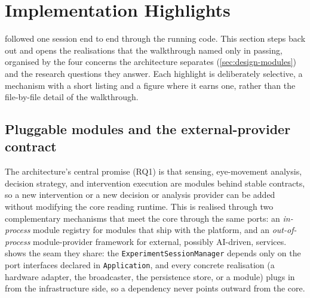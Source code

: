 \section{Implementation Highlights}
\label{sec:impl-highlights}
\usetikzlibrary{shapes.multipart, arrows.meta}

 followed one session end to end through the running code.
This section steps back out and opens the realisations that the walkthrough named only in passing, organised by the four concerns the architecture separates (\cref{sec:design-modules}) and the research questions they answer.
Each highlight is deliberately selective, a mechanism with a short listing and a figure where it earns one, rather than the file-by-file detail of the walkthrough.

\FloatBarrier
\subsection{Pluggable modules and the external-provider contract}
\label{sec:impl-modularity}

The architecture's central promise (RQ1) is that sensing, eye-movement analysis, decision strategy, and intervention execution are modules behind stable contracts, so a new intervention or a new decision or analysis provider can be added without modifying the core reading runtime.
This is realised through two complementary mechanisms that meet the core through the same ports: an \emph{in-process} module registry for modules that ship with the platform, and an \emph{out-of-process} module-provider framework for external, possibly AI-driven, services.
 shows the seam they share: the \texttt{ExperimentSessionManager} depends only on the port interfaces declared in \texttt{Application}, and every concrete realisation (a hardware adapter, the broadcaster, the persistence store, or a module) plugs in from the infrastructure side, so a dependency never points outward from the core.

